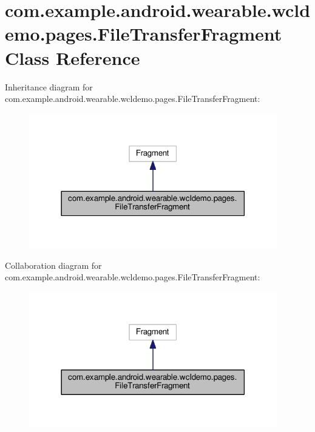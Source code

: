\hypertarget{classcom_1_1example_1_1android_1_1wearable_1_1wcldemo_1_1pages_1_1FileTransferFragment}{}\section{com.\+example.\+android.\+wearable.\+wcldemo.\+pages.\+File\+Transfer\+Fragment Class Reference}
\label{classcom_1_1example_1_1android_1_1wearable_1_1wcldemo_1_1pages_1_1FileTransferFragment}


Inheritance diagram for com.\+example.\+android.\+wearable.\+wcldemo.\+pages.\+File\+Transfer\+Fragment\+:\nopagebreak
\begin{figure}[H]
\begin{center}
\leavevmode
\includegraphics[width=306pt]{da/d97/classcom_1_1example_1_1android_1_1wearable_1_1wcldemo_1_1pages_1_1FileTransferFragment__inherit__graph}
\end{center}
\end{figure}


Collaboration diagram for com.\+example.\+android.\+wearable.\+wcldemo.\+pages.\+File\+Transfer\+Fragment\+:\nopagebreak
\begin{figure}[H]
\begin{center}
\leavevmode
\includegraphics[width=306pt]{d5/d29/classcom_1_1example_1_1android_1_1wearable_1_1wcldemo_1_1pages_1_1FileTransferFragment__coll__graph}
\end{center}
\end{figure}
